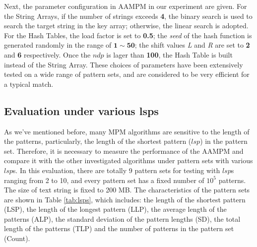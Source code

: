 \documentclass{article}
\begin{document}
Next, the parameter configuration in \textsf{AAMPM} in our experiment
are given. For the String Arrays, if the number of strings exceeds
\textbf{4}, the binary search is used to search the target string in
the key array; otherwise, the linear search is adopted. For the Hash
Tables, the load factor is set to \textbf{0.5}; the \emph{seed} of the
hash function is generated randomly in the range of
$\mathbf{1} \sim \mathbf{50}$; the shift values \emph{L} and \emph{R}
are set to \textbf{2} and \textbf{6} respectively. Once the $ndp$ is
lager than \textbf{100}, the Hash Table is built instead of the String
Array. These choices of parameters have been extensively tested on a
wide range of pattern sets, and are considered to be very efficient
for a typical match.




\subsection{Evaluation under various lsps}

As we've mentioned before, many MPM algorithms are sensitive to the
length of the patterns, particularly, the length of the shortest
pattern ($lsp$) in the pattern set. Therefore, it is necessary to
measure the performance of the \textsf{AAMPM} and compare it with the
other investigated algorithms under pattern sets with various
$lsp$s. In this evaluation, there are totally 9 pattern sets for
testing with $lsp$s ranging from 2 to 10, and every pattern set has a
fixed number of $10^5$ patterns. The size of text string is fixed to
200 MB. The characteristics of the pattern sets are shown in Table
\ref{tab:lsps}, which includes: the length of the shortest pattern
(LSP), the length of the longest pattern (LLP), the average length of
the patterns (ALP), the standard deviation of the pattern lengths
(SD), the total length of the patterns (TLP) and the number of
patterns in the pattern set (Count).
\end{document}
